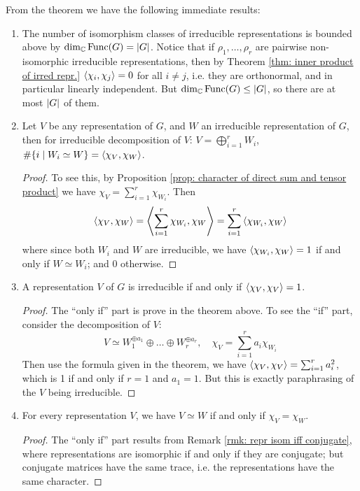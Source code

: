 \documentclass{article}
\begin{document}
\begin{corollary}\label{cor: inner prod. of repr.}
    From the theorem we have the following immediate results:
    \begin{enumerate}[label=\arabic*)]
        \item The number of isomorphism classes of irreducible representations is bounded above by $\dim_{\mathbb{C}} \mathrm{Func}(G) = \left|G\right|$. Notice that if $\rho_1, \dots, \rho_r$ are pairwise non-isomorphic irreducible representations, then by Theorem \ref{thm: inner product of irred repr.} $\left\langle \chi_i, \chi_j \right\rangle = 0$ for all $i \neq j$, i.e. they are orthonormal, and in particular linearly independent. But $\dim_{\mathbb{C}} \mathrm{Func}(G) \leq \left|G\right|$, so there are at most $\left|G\right|$ of them. 
        \item Let $V$ be any representation of $G$, and $W$ an irreducible representation of $G$, then for irreducible decomposition of $V$: $V = \bigoplus_{i = 1}^r W_i$, $\#\{ i \mid W_i \simeq W \} = \left\langle \chi_V, \chi_W \right\rangle$. 
        \begin{proof}
            To see this, by Proposition \ref{prop: character of direct sum and tensor product} we have $\chi_V = \sum_{i = 1}^r \chi_{W_i}$. Then
            \[
                \left\langle \chi_V, \chi_W \right\rangle = \left\langle \sum_{i = 1}^r \chi_{W_i}, \chi_W \right\rangle = \sum_{i = 1}^r \left\langle \chi_{W_i}, \chi_W \right\rangle
                \]
                where since both $W_i$ and $W$ are irreducible, we have $\left\langle \chi_{W_i}, \chi_W \right\rangle = 1$ if and only if $W \simeq W_i$; and 0 otherwise.
        \end{proof}
        \item A representation $V$ of $G$ is irreducible if and only if $\left\langle \chi_V, \chi_V \right\rangle = 1$.
        \begin{proof}
            The ``only if'' part is prove in the theorem above. To see the ``if'' part, consider the decomposition of $V$:
            \[
                V \simeq W_1^{\oplus a_1} \oplus \dots \oplus W_r^{\oplus a_r}, \quad \chi_V = \sum_{i = 1}^r a_i \chi_{W_i}
            \]
            Then use the formula given in the theorem, we have $\left\langle \chi_V, \chi_V \right\rangle = \sum_{i = 1}^r a_i^2$, which is 1 if and only if $r = 1$ and $a_1 = 1$. But this is exactly paraphrasing of the $V$ being irreducible.
        \end{proof}
        \item For every representation $V$, we have $V \simeq W$ if and only if $\chi_V = \chi_W$.
        \begin{proof}
            The ``only if'' part results from Remark \ref{rmk: repr isom iff conjugate}, where representations are isomorphic if and only if they are conjugate; but conjugate matrices have the same trace, i.e. the representations have the same character.


\end{proof}
\end{enumerate}
\end{corollary}
\end{document}
